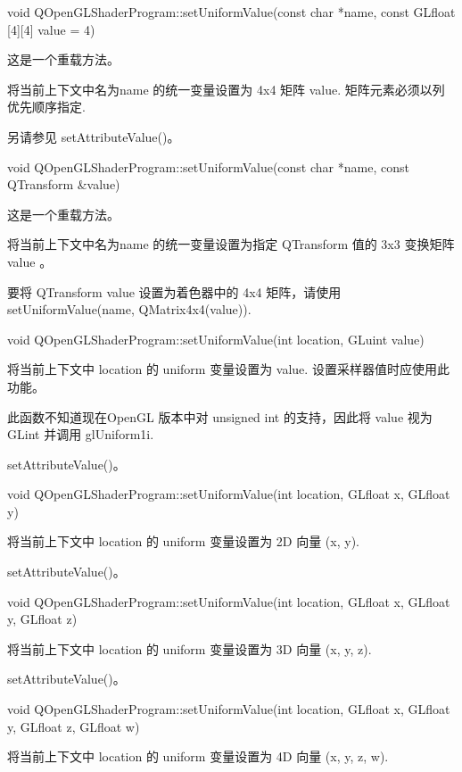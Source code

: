 void QOpenGLShaderProgram::setUniformValue(const char *name, const GLfloat [4][4] value = 4)

这是一个重载方法。

将当前上下文中名为name 的统一变量设置为 4x4 矩阵 value. 矩阵元素必须以列优先顺序指定.


\begin{seeAlso}
另请参见 setAttributeValue()。
\end{seeAlso}

void QOpenGLShaderProgram::setUniformValue(const char *name, const QTransform \&value)

这是一个重载方法。

将当前上下文中名为name 的统一变量设置为指定 QTransform 值的 3x3 变换矩阵 value 。

要将 QTransform value 设置为着色器中的 4x4 矩阵，请使用 setUniformValue(name, QMatrix4x4(value)).

void QOpenGLShaderProgram::setUniformValue(int location, GLuint value)

将当前上下文中 location 的 uniform 变量设置为 value. 设置采样器值时应使用此功能。


\begin{notice}
此函数不知道现在OpenGL 版本中对 unsigned int 的支持，因此将 value 视为 GLint 并调用 glUniform1i.
\end{notice}


\begin{seeAlso}
setAttributeValue()。
\end{seeAlso}

void QOpenGLShaderProgram::setUniformValue(int location, GLfloat x, GLfloat y)

将当前上下文中 location 的 uniform 变量设置为 2D 向量 (x, y).

\begin{seeAlso}
setAttributeValue()。
\end{seeAlso}

void QOpenGLShaderProgram::setUniformValue(int location, GLfloat x, GLfloat y, GLfloat z)

将当前上下文中 location 的 uniform 变量设置为 3D 向量 (x, y, z).


\begin{seeAlso}
setAttributeValue()。
\end{seeAlso}

void QOpenGLShaderProgram::setUniformValue(int location, GLfloat x, GLfloat y, GLfloat z, GLfloat w)

将当前上下文中 location 的 uniform 变量设置为 4D 向量 (x, y, z, w).

